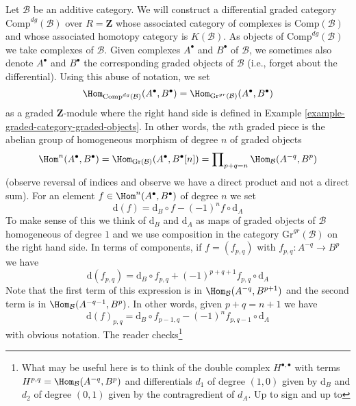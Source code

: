 \begin{example}
\label{example-category-complexes}
Let $\mathcal{B}$ be an additive category. We will construct
a differential graded category $\text{Comp}^{dg}(\mathcal{B})$
over $R = \mathbf{Z}$ whose associated category of complexes
is $\text{Comp}(\mathcal{B})$ and whose associated homotopy
category is $K(\mathcal{B})$. As objects of $\text{Comp}^{dg}(\mathcal{B})$
we take complexes of $\mathcal{B}$. Given complexes
$A^\bullet$ and $B^\bullet$ of $\mathcal{B}$, we sometimes also
denote $A^\bullet$ and $B^\bullet$ the corresponding graded objects
of $\mathcal{B}$ (i.e., forget about the differential).
Using this abuse of notation, we set
$$
\Hom_{\text{Comp}^{dg}(\mathcal{B})}(A^\bullet, B^\bullet) =
\Hom_{\text{Gr}^{gr}(\mathcal{B})}(A^\bullet, B^\bullet)
$$
as a graded $\mathbf{Z}$-module where the right hand side is defined
in Example \ref{example-graded-category-graded-objects}.
In other words, the $n$th graded piece is
the abelian group of homogeneous morphism of degree $n$ of graded objects
$$
\Hom^n(A^\bullet, B^\bullet) =
\Hom_{\text{Gr}(\mathcal{B})}(A^\bullet, B^\bullet[n]) =
\prod\nolimits_{p + q = n} \Hom_\mathcal{B}(A^{-q}, B^p)
$$
(observe reversal of indices and observe we have a direct product
and not a direct sum). For an element
$f \in \Hom^n(A^\bullet, B^\bullet)$ of degree $n$ we set
$$
\text{d}(f) = \text{d}_B \circ f - (-1)^n f \circ \text{d}_A
$$
To make sense of this we think of $\text{d}_B$ and $\text{d}_A$
as maps of graded objects of $\mathcal{B}$ homogeneous of degree $1$
and we use composition in the category $\text{Gr}^{gr}(\mathcal{B})$
on the right hand side. In terms of components, if $f = (f_{p, q})$ with
$f_{p, q} : A^{-q} \to B^p$ we have
\begin{equation}
\label{equation-differential-hom-complex}
\text{d}(f_{p, q}) =
\text{d}_B \circ f_{p, q} + (-1)^{p + q + 1} f_{p, q} \circ \text{d}_A 
\end{equation}
Note that the first term of this expression is in
$\Hom_\mathcal{B}(A^{-q}, B^{p + 1})$ and the second term is in
$\Hom_\mathcal{B}(A^{-q - 1}, B^p)$.
In other words, given $p + q = n + 1$ we have
$$
\text{d}(f)_{p, q} =
\text{d}_B \circ f_{p - 1, q} - (-1)^n f_{p, q - 1} \circ \text{d}_A
$$
with obvious notation. The reader checks\footnote{What may be useful
here is to think of the double complex $H^{\bullet, \bullet}$ with terms
$H^{p, q} = \Hom_\mathcal{B}(A^{-q}, B^p)$ and differentials
$d_1$ of degree $(1, 0)$ given by $\text{d}_B$ and $d_2$ of degree
$(0, 1)$ given by the contragredient of $d_A$. Up to sign and up to
}
\end{example}
